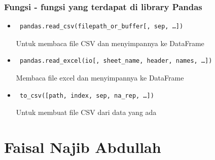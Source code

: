 \subsubsection{Fungsi - fungsi yang terdapat di library Pandas}
\begin{itemize}
	\item \begin{verbatim} pandas.read_csv(filepath_or_buffer[, sep, …]) \end{verbatim} Untuk membaca file CSV dan menyimpannya ke DataFrame
	\item \begin{verbatim} pandas.read_excel(io[, sheet_name, header, names, …])  \end{verbatim} Membaca file excel dan menyimpannya ke DataFrame
	\item \begin{verbatim} to_csv([path, index, sep, na_rep, …]) \end{verbatim}
	Untuk membuat file CSV dari data yang ada	
\end{itemize}

\section{Faisal Najib Abdullah}
